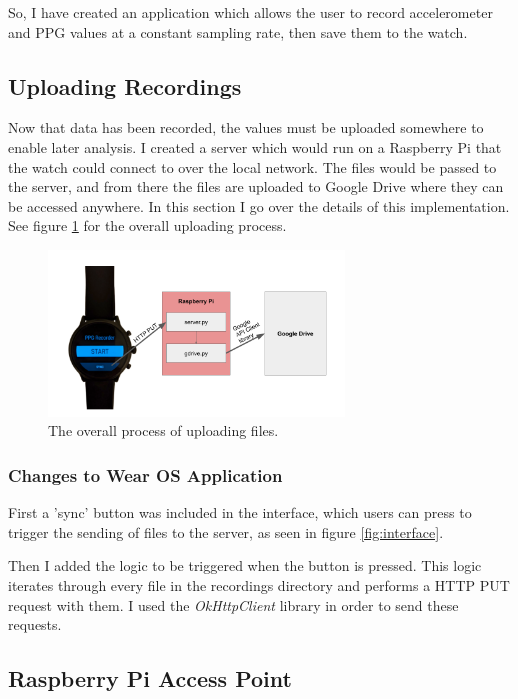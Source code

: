 \documentclass[12pt,a4paper,twoside,openany]{report}
\begin{document}
So, I have created an application which allows the user to record
accelerometer and PPG values at a constant sampling rate, then save them to
the watch.

\subsection{Uploading Recordings}

Now that data has been recorded, the values must be uploaded somewhere to enable
later analysis. I created a server which would run on a Raspberry Pi that the
watch could connect to over the local network. The files would be passed to
the server, and from there the files are uploaded to Google Drive where they
can be accessed anywhere. In this section I go over the details of this
implementation. See figure \ref{fig:upload} for the overall uploading process.

\begin{figure}[tbh]
	\centerline{\includegraphics[width=0.7\textwidth]{figs/upload.png}}
	\caption{The overall process of uploading files.}
	\label{fig:upload}
\end{figure}

\subsubsection{Changes to Wear OS Application}

First a 'sync' button was included in the interface, which users can press to
trigger the sending of files to the server, as seen in figure
\ref{fig:interface}.

Then I added the logic to be triggered when the button is pressed. This logic
iterates through every file in the recordings directory and performs a HTTP
PUT request with them. I used the \emph{OkHttpClient} library in order to
send these requests.

\subsection{Raspberry Pi Access Point}
\end{document}
